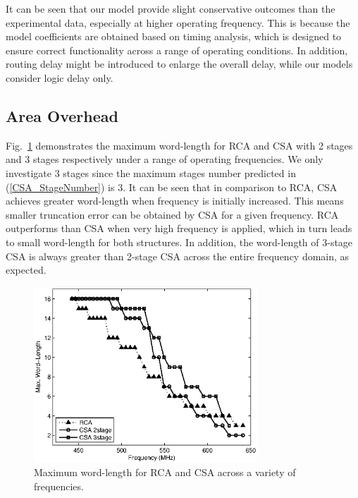 \documentclass[journal]{IEEEtran}
\begin{document}
It can be seen that our model provide slight conservative outcomes than the experimental data, especially at higher operating frequency. This is because the model coefficients are obtained based on timing analysis, which is designed to ensure correct functionality across a range of operating conditions. In addition, routing delay might be introduced to enlarge the overall delay, while our models consider logic delay only. 

\subsection{Area Overhead}
Fig.~\ref{CSA3stage Timing} demonstrates the maximum word-length for RCA and CSA with 2 stages and 3 stages respectively under a range of operating frequencies. We only investigate 3 stages since the maximum stages number predicted in (\ref{CSA_StageNumber}) is 3. It can be seen that in comparison to RCA, CSA achieves greater word-length when frequency is initially increased. This means smaller truncation error can be obtained by CSA for a given frequency. RCA outperforms than CSA when very high frequency is applied, which in turn leads to small word-length for both structures. In addition, the word-length of 3-stage CSA is always greater than 2-stage CSA across the entire frequency domain, as expected.  
\begin{figure}[htbp]
  \centering
  \includegraphics[width=3.3in]{./Figures/CSA3stage_Timing.eps}
  \caption{Maximum word-length for RCA and CSA across a variety of frequencies.}
  \label{CSA3stage Timing}
\end{figure}
\end{document}
